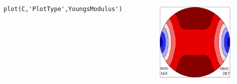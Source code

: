 \documentclass[compress]{beamer}
\begin{document}
\begin{frame}[fragile]
\begin{overlayarea}{\textwidth}{\textheight}
\begin{onlyenv}
\begin{columns}
\begin{column}{7.7cm}
\begin{lstlisting}[style=input]
plot(C,'PlotType',YoungsModulus')
\end{lstlisting}

    \end{column}
    \begin{column}{4cm}
      \includegraphics[width=4cm]{pic/YM}
    \end{column}
  \end{columns}
\end{onlyenv}

\end{overlayarea}
\end{frame}
\end{document}
